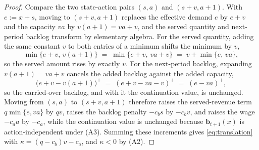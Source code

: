 \documentclass[10pt,a4paper]{amsart}
\newcommand{\bvec}[1]{\mathbf{#1}}
\begin{document}
\begin{proof}
Compare the two state-action pairs $(s,a)$ and $(s+v,a+1)$. With $e := x+s$, moving to $(s+v,a+1)$ replaces the effective demand $e$ by $e+v$ and the capacity $va$ by $v(a+1)=va+v$, and the served quantity and next-period backlog transform by elementary algebra. For the served quantity, adding the same constant $v$ to both entries of a minimum shifts the minimum by $v$,
\[
\min\{e+v,\,v(a+1)\} \;=\; \min\{e+v,\,va+v\} \;=\; v + \min\{e,\,va\},
\]
so the served amount rises by exactly $v$. For the next-period backlog, expanding $v(a+1)=va+v$ cancels the added backlog against the added capacity,
\[
\bigl(e+v - v(a+1)\bigr)^+ \;=\; (e+v-va-v)^+ \;=\; (e - va)^+,
\]
so the carried-over backlog, and with it the continuation value, is unchanged. Moving from $(s,a)$ to $(s+v,a+1)$ therefore raises the served-revenue term $q\min\{e,va\}$ by $qv$, raises the backlog penalty $-c_b s$ by $-c_b v$, and raises the wage $-c_a a$ by $-c_a$, while the continuation value is unchanged because $\bvec{b}_{t+1}(x)$ is action-independent under (A3). Summing these increments gives \eqref{eq:translation} with $\kappa = (q-c_b)v - c_a$, and $\kappa < 0$ by (A2).
\end{proof}
\end{document}
